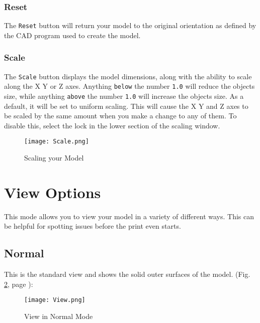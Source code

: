\subsubsection{Reset}
The \texttt{Reset} button will return your model to the original orientation as defined by the CAD program used to create the model.

\subsubsection{Scale}
The \texttt{Scale} button displays the model dimensions, along with the ability to scale along the X Y or Z axes. Anything \texttt{below} the number \texttt{1.0} will reduce the objects size, while anything \texttt{above} the number \texttt{1.0} will increase the objects size. As a default, it will be set to uniform scaling. This will cause the X Y and Z axes to be scaled by the same amount when you make a change to any of them. To disable this, select the lock in the lower section of the scaling window. 
\begin{figure}[H]
\centering
\texttt{[image: Scale.png]}
\caption{Scaling your Model}
\label{fig:Scaling your Model}
\end{figure}

\section{View Options}
This mode allows you to view your model in a variety of different ways. This can be helpful for spotting issues before the print even starts. 

\subsection{Normal}
This is the standard view and shows the solid outer surfaces of the model. (Fig. \ref{fig:Normal View}, page \pageref{fig:Normal View}): 

\begin{figure}[H]
\centering
\texttt{[image: View.png]}
\caption{View in Normal Mode}
\label{fig:Normal View}
\end{figure}

